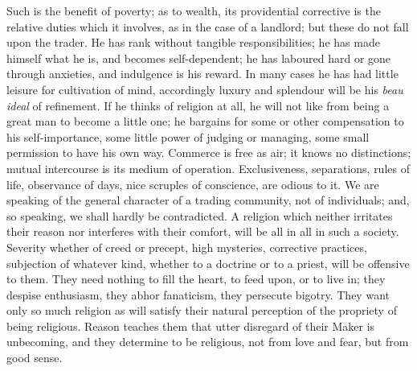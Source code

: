 Such is the benefit of poverty; as to wealth, its
providential corrective is the relative duties which it involves, as
in the case of a landlord; but these do not fall upon the trader. He
has rank without tangible responsibilities; he has made himself what
he is, and becomes self-dependent; he has laboured hard or gone
through anxieties, and indulgence is his reward. In many cases he has
had little leisure for cultivation of mind, accordingly luxury and
splendour will be his \emph{beau ideal} of refinement. If he thinks of
religion at all, he will not like from being a great man to become a
little one; he bargains for some or other compensation to his
self-importance, some little power of judging or managing, some small
permission to have his own way. Commerce is free as air; it knows no
distinctions; mutual intercourse is its medium of operation.
Exclusiveness, separations, rules of life, observance of days, nice
scruples of conscience, are odious to it. We are speaking of the
general character of a trading community, not of individuals; and, so
speaking, we shall hardly be contradicted. A religion which neither
irritates their reason nor interferes with their comfort, will be all
in all in such a society. Severity whether of creed or precept, high
mysteries, corrective practices, subjection of whatever kind, whether
to a doctrine or to a priest, will be offensive to them. They need
nothing to fill the heart, to feed upon, or to live in; they despise
enthusiasm, they abhor fanaticism, they persecute bigotry. They want
only so much religion as will satisfy their natural perception of the
propriety of being religious. Reason teaches them that utter disregard
of their Maker is unbecoming, and they determine to be religious, not
from love and fear, but from good sense.

